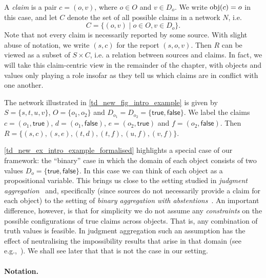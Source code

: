 A \emph{claim} is a pair $c = (o, v)$, where $o \in O$ and $v \in D_o$. We
write $\operatorname{obj}(c) = o$ in this case, and let $C$ denote the set of all possible
claims in a network $N$, i.e.
\[
    C = \{(o, v) \mid o \in O, v \in D_o\}.
\]
Note that not every claim is necessarily reported by some source. With slight
abuse of notation, we write $(s, c)$ for the report $(s, o, v)$. Then $R$ can
be viewed as a subset of $S \times C$, i.e. a relation between sources and
claims. In fact, we will take this claim-centric view in the remainder of the
chapter, with objects and values only playing a role insofar as they tell us
which claims are in conflict with one another.

\begin{example}
    \label{td_new_ex_intro_example_formalised}
    The network illustrated in \cref{td_new_fig_intro_example} is given by $S =
    \{s, t, u, v\}$, $O = \{o_1, o_2\}$ and $D_{o_1} = D_{o_2} =
    \{\mathsf{true}, \mathsf{false}\}$. We label the claims $c = (o_1,
    \mathsf{true})$, $d = (o_1, \mathsf{false})$, $e = (o_2, \mathsf{true})$
    and $f = (o_2, \mathsf{false})$. Then
    $
        R = \{
            (s, c), (s, e),
            (t, d), (t, f),
            (u, f),
            (v, f)
        \}
    $.
\end{example}

\cref{td_new_ex_intro_example_formalised} highlights a special case of our
framework: the ``binary'' case in which the domain of each object consists of
two values $D_o = \{\mathsf{true}, \mathsf{false}\}$.  In this case we can
think of each object as a propositional variable. This brings us close to the
setting studied in \emph{judgment aggregation}~\cite{endriss2016ja} and,
specifically (since sources do not necessarily provide a claim for each
object) to the setting of \emph{binary aggregation with
abstentions}~\cite{christoffbinary,dokow}. An important difference, however, is
that for simplicity we do not assume any \emph{constraints} on the possible
configurations of true claims across objects. That is, any combination of truth
values is feasible. In judgment aggregation such an assumption has the effect
of neutralising the impossibility results that arise in that domain (see
e.g.,~\cite{christoffbinary}). We shall see later that that is not the case in
our setting.

\paragraph{Notation.}

